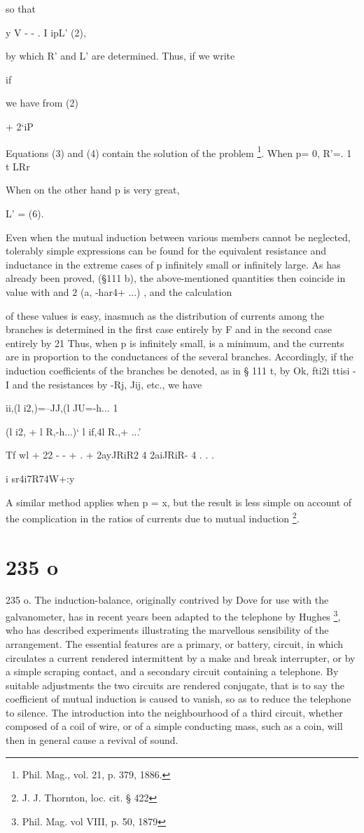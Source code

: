 so that

y  V - - . I ipL' (2),

by which R' and L' are determined. Thus, if we write

if

we have from (2)

+ 2‘iP

Equations (3) and (4) contain the solution of the problem
\footnote{Phil. Mag., vol. 21, p. 379, 1886.}.
When  p= 0,
R'=.  1 t LRr

When on the other hand p is very great,

L' = (6).

Even when the mutual induction between
various members cannot be neglected, tolerably simple expressions can be found
for the equivalent resistance and inductance in the extreme cases of p
infinitely small or infinitely large. As has already been proved, (§111 b), the
above-mentioned quantities then coincide in value with and 2  (a, -har4+ ...) ,
and the calculation

of these values is easy, inasmuch as the distribution of currents among the
branches is determined in the first case entirely by F and in the second case
entirely by 21 Thus, when p is infinitely small, is a minimum, and the currents
are in proportion to the conductances of the several branches. Accordingly, if
the induction coefficients of the branches be denoted, as in § 111 t, by Ok,
fti2i ttisi -I and the resistances by -Rj, Jij, etc., we have

ii,(l i2,)=--JJ,(l JU=-h... 1

(l i2, + l R,-h...)‘ l if,4l R.,+ ...'

Tf  wl  + 22 - -  +  .  + 2ayJRiR2 4 2aiJRiR- 4 . . .

i sr4i7R74W+:y

A similar method applies when p = x, but the result is less simple on account
of the complication in the ratios of currents due to mutual induction
\footnote{J. J. Thornton, loc. cit. § 422}.

\section{235 o}
235 o. The induction-balance, originally contrived by Dove for use with the
galvanometer, has in recent years been adapted to the telephone by Hughes
\footnote{Phil. Mag. vol VIII, p. 50, 1879},
who has described experiments illustrating the marvellous sensibility of the
arrangement. The essential features are a primary, or battery, circuit, in
which circulates a current rendered intermittent by a make and break
interrupter, or by a simple scraping contact, and a secondary circuit containing
a telephone. By suitable adjustments the two circuits are rendered conjugate,
that is to say the coefficient of mutual induction is caused to vanish, so as
to reduce the telephone to silence. The introduction into the neighbourhood of
a third circuit, whether composed of a coil of wire, or of a simple conducting
mass, such as a coin, will then in general cause a revival of sound.

